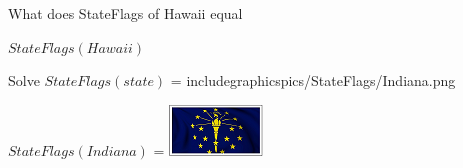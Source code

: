 \documentclass{ximera}
\begin{document}
\begin{question}

What does StateFlags of Hawaii equal

\begin{multipleChoice}
\end{multipleChoice}
\begin{feedback}
$StateFlags(Hawaii)$ 
\end{feedback}
\end{question}





\begin{question}

Solve $StateFlags(state)$ = includegraphics{pics/StateFlags/Indiana.png}

\begin{multipleChoice}
\end{multipleChoice}
\begin{feedback}
$StateFlags(Indiana)$ = \includegraphics{pics/StateFlags/Indiana.png}
\end{feedback}
\end{question}
\end{document}
